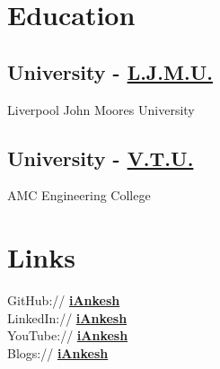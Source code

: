 \documentclass[a4paper]{deedy-resume-openfont}
\begin{document}
%
%
\lastupdated

%
%

%
%

\begin{minipage}[t]{0.33\textwidth} 


\section{Education} 

\subsection{University - \href{https://www.ljmu.ac.uk/}{L.J.M.U.}}
Liverpool John Moores University \\
\sectionsep

\subsection{University - \href{https://vtu.ac.in/}{V.T.U.}}
AMC Engineering College \\


\section{Links} 
GitHub:// \href{https://github.com/iankesh}{\bf iAnkesh} \\
LinkedIn://  \href{https://www.linkedin.com/in/iankesh}{\bf iAnkesh} \\
YouTube://  \href{https://www.youtube.com/c/iAnkesh}{\bf iAnkesh} \\
Blogs://  \href{https://iankesh.blogspot.com/2020/08/my-blogs.html}{\bf iAnkesh} \\


\end{minipage}
\end{document}
